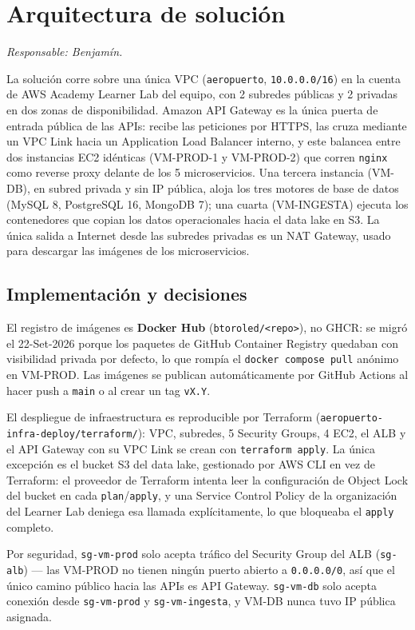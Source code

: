 \section{Arquitectura de solución}
\textit{Responsable: Benjamín.}

La solución corre sobre una única VPC (\texttt{aeropuerto}, \texttt{10.0.0.0/16}) en la cuenta de AWS
Academy Learner Lab del equipo, con 2 subredes públicas y 2 privadas en dos zonas de disponibilidad.
Amazon API Gateway es la única puerta de entrada pública de las APIs: recibe las peticiones por HTTPS,
las cruza mediante un VPC Link hacia un Application Load Balancer interno, y este balancea entre dos
instancias EC2 idénticas (VM-PROD-1 y VM-PROD-2) que corren \texttt{nginx} como reverse proxy delante
de los 5 microservicios. Una tercera instancia (VM-DB), en subred privada y sin IP pública, aloja los
tres motores de base de datos (MySQL 8, PostgreSQL 16, MongoDB 7); una cuarta (VM-INGESTA) ejecuta los
contenedores que copian los datos operacionales hacia el data lake en S3. La única salida a Internet
desde las subredes privadas es un NAT Gateway, usado para descargar las imágenes de los microservicios.

\subsection{Implementación y decisiones}

El registro de imágenes es \textbf{Docker Hub} (\texttt{btoroled/<repo>}), no GHCR: se migró el
22-Set-2026 porque los paquetes de GitHub Container Registry quedaban con visibilidad privada por
defecto, lo que rompía el \texttt{docker compose pull} anónimo en VM-PROD. Las imágenes se publican
automáticamente por GitHub Actions al hacer push a \texttt{main} o al crear un tag \texttt{vX.Y}.

El despliegue de infraestructura es reproducible por Terraform (\texttt{aeropuerto-infra-deploy/terraform/}):
VPC, subredes, 5 Security Groups, 4 EC2, el ALB y el API Gateway con su VPC Link se crean con
\texttt{terraform apply}. La única excepción es el bucket S3 del data lake, gestionado por AWS CLI en
vez de Terraform: el proveedor de Terraform intenta leer la configuración de Object Lock del bucket en
cada \texttt{plan}/\texttt{apply}, y una Service Control Policy de la organización del Learner Lab
deniega esa llamada explícitamente, lo que bloqueaba el \texttt{apply} completo.

Por seguridad, \texttt{sg-vm-prod} solo acepta tráfico del Security Group del ALB (\texttt{sg-alb}) —
las VM-PROD no tienen ningún puerto abierto a \texttt{0.0.0.0/0}, así que el único camino público hacia
las APIs es API Gateway. \texttt{sg-vm-db} solo acepta conexión desde \texttt{sg-vm-prod} y
\texttt{sg-vm-ingesta}, y VM-DB nunca tuvo IP pública asignada.

